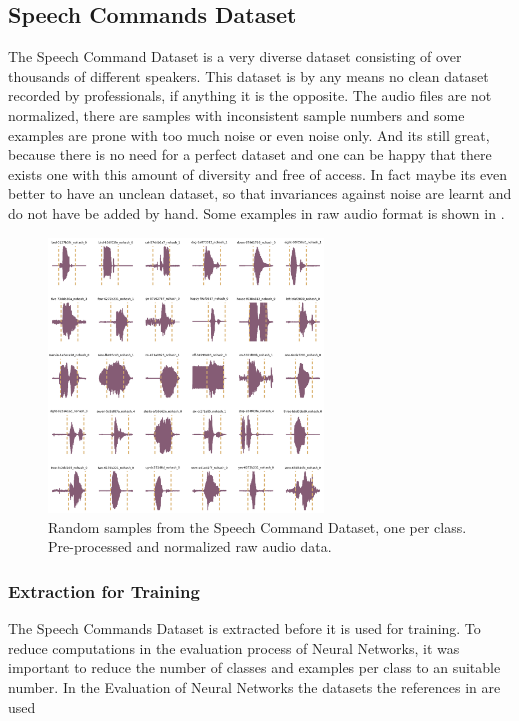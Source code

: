 
\subsection{Speech Commands Dataset}
The Speech Command Dataset \cite{warden2018} is a very diverse dataset consisting of over thousands of different speakers. This dataset is by any means no clean dataset recorded by professionals, if anything it is the opposite. 
The audio files are not normalized, there are samples with inconsistent sample numbers and some examples are prone with too much noise or even noise only.
And its still great, because there is no need for a perfect dataset and one can be happy that there exists one with this amount of diversity and free of access.
In fact maybe its even better to have an unclean dataset, so that invariances against noise are learnt and do not have be added by hand.
Some examples in raw audio format is shown in .
\begin{figure}[!ht]
  \centering
    \includegraphics[width=0.65\textwidth]{./4_practice/figs/dataset_wav_grid_c30}
  \caption{Random samples from the Speech Command Dataset, one per class. Pre-processed and normalized raw audio data.}
  \label{fig:dataset_wav_grid_c30}
\end{figure}
\FloatBarrier
\noindent

\subsubsection{Extraction for Training}
The Speech Commands Dataset is extracted before it is used for training. 
To reduce computations in the evaluation process of Neural Networks, it was important to reduce the number of classes and examples per class to an suitable number.
In the Evaluation of Neural Networks the datasets the references in  are used


